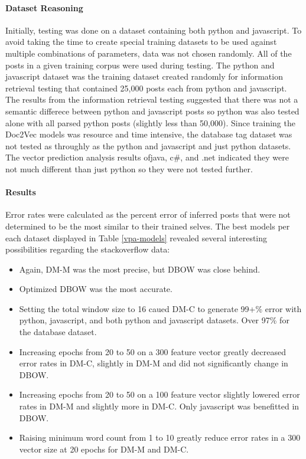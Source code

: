 \paragraph{Dataset Reasoning} Initially, testing was done on a dataset containing both python and javascript. To avoid taking the time to create special training datasets to be used against multiple combinations of parameters, data was not chosen randomly. All of the posts in a given training corpus were used during testing. The python and javascript dataset was the training dataset created randomly for information retrieval testing that contained 25,000 posts each from python and javascript. The results from the information retrieval testing suggested that there was not a semantic differece between python and javascript posts so python was also tested alone with all parsed python posts (slightly less than 50,000). Since training the Doc2Vec models was resource and time intensive, the database tag dataset was not tested as throughly as the python and javascript and just python datasets. The vector prediction analysis results ofjava, c\#, and .net indicated they were not much different than just python so they were not tested further.  

\paragraph{Results} Error rates were calculated as the percent error of inferred posts that were not determined to be the most similar to their trained selves. The best models per each dataset displayed in Table \ref{vpa-models} revealed several interesting possibilities regarding the stackoverflow data:

\begin{itemize}
  \item Again, DM-M was the most precise, but DBOW was close behind.
  \item Optimized DBOW was the most accurate.
  \item Setting the total window size to 16 caued DM-C to generate 99+\% error with python, javascript, and both python and javascript datasets. Over 97\% for the database dataset.
  \item Increasing epochs from 20 to 50 on a 300 feature vector greatly decreased error rates in DM-C, slightly in DM-M and did not significantly change in DBOW. 
  \item Increasing epochs from 20 to 50 on a 100 feature vector slightly lowered error rates in DM-M and slightly more in DM-C. Only javascript was benefitted in DBOW.
  \item Raising minimum word count from 1 to 10 greatly reduce error rates in a 300 vector size at 20 epochs for DM-M and DM-C.
\end{itemize}

